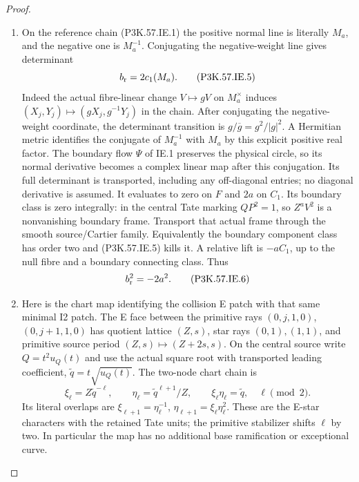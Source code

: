\begin{proof}
\begin{enumerate}[label=\arabic*.]
\item On the reference chain (P3K.57.IE.1) the positive normal
line is literally \(M_a\), and the negative one
is \(M_a^{-1}\). Conjugating the negative-weight
line gives determinant
\[
                          b_{\rm r}=2c_1(M_a).          \tag{P3K.57.IE.5}
\]
Indeed the actual fibre-linear change \(V\mapsto gV\)
on \(M_a^\times\) induces
\((X_j,Y_j)\mapsto(gX_j,g^{-1}Y_j)\) in the chain.
After conjugating the negative-weight coordinate,
the determinant transition is
\(g/\overline g=g^2/|g|^2\). A Hermitian metric
identifies the conjugate of \(M_a^{-1}\) with
\(M_a\) by this explicit positive real factor.
The boundary flow \(\Psi\) of IE.1 preserves the
physical circle, so its normal derivative becomes
a complex linear map after this conjugation. Its
full determinant is transported, including any
off-diagonal entries; no diagonal derivative is
assumed.
It evaluates to zero on \(F\) and \(2a\) on \(C_1\).
Its boundary class is zero integrally: in the
central Tate marking \(QP^2=1\), so \(Z^aV^2\)
is a nonvanishing boundary frame. Transport that
actual frame through the smooth source/Cartier
family. Equivalently the boundary component class
has order two and (P3K.57.IE.5) kills it. A relative lift
is \(-aC_1\), up to the null fibre and a boundary
connecting class. Thus
\[
                              b_{\rm r}^2=-2a^2.        \tag{P3K.57.IE.6}
\]

\item Here is the chart map identifying the collision E
patch with that same minimal I2 patch. The E face
between the primitive rays
\((0,j,1,0)\), \((0,j+1,1,0)\) has quotient lattice
\((Z,s)\), star rays \((0,1),(1,1)\), and primitive
source period \((Z,s)\mapsto(Z+2s,s)\). On the central
source write \(Q=t^2u_Q(t)\) and use the actual
square root with transported leading coefficient,
\(\widetilde q=t\sqrt{u_Q(t)}\). The two-node chart
chain is
\[
 \xi_\ell=Z\widetilde q^{-\ell},\qquad
 \eta_\ell=\widetilde q^{\ell+1}/Z,\qquad
 \xi_\ell\eta_\ell=\widetilde q,
 \quad \ell\pmod2.                                  \tag{P3K.57.IE.5a}
\]
Its literal overlaps are
\(\xi_{\ell+1}=\eta_\ell^{-1}\),
\(\eta_{\ell+1}=\xi_\ell\eta_\ell^2\).
These are the E-star characters with the retained
Tate units; the primitive stabilizer shifts
\(\ell\) by two. In particular the map has no
additional base ramification or exceptional curve.


\end{enumerate}
\end{proof}
